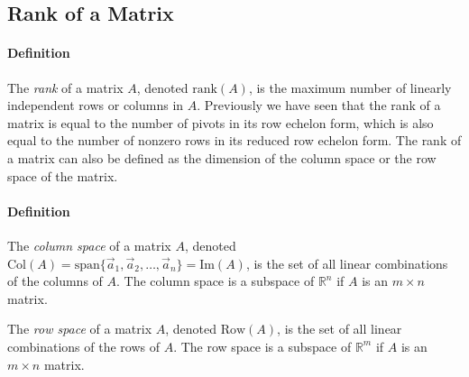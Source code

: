 \subsection*{Rank of a Matrix}
\paragraph*{Definition}
The \textit{rank} of a matrix $A$, denoted $\mathrm{rank}(A)$, is the maximum number of linearly independent rows or columns in $A$.
Previously we have seen that the rank of a matrix is equal to the number of pivots in its row echelon form, which is also equal to the number of nonzero rows in its reduced row echelon form. 
The rank of a matrix can also be defined as the dimension of the column space or the row space of the matrix.

\paragraph*{Definition}
The \emph{column space} of a matrix $A$, denoted $\mathrm{Col}(A) = \text{span}\{\vec{a}_1, \vec{a}_2, \ldots, \vec{a}_n\} = \text{Im}(A)$, is the set of all linear combinations of the columns of $A$. 
The column space is a subspace of $\mathbb{R}^n$ if $A$ is an $m \times n$ matrix.

The \emph{row space} of a matrix $A$, denoted $\mathrm{Row}(A)$, is the set of all linear combinations of the rows of $A$.
The row space is a subspace of $\mathbb{R}^m$ if $A$ is an $m \times n$ matrix.

